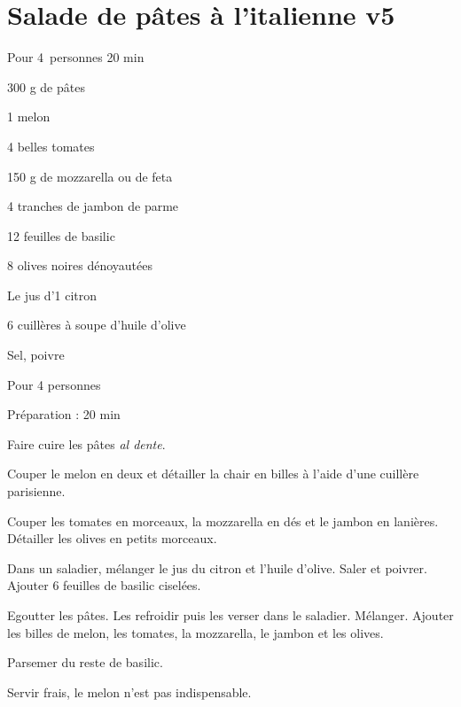 \clearpage
\section{Salade de pâtes à l'italienne v5}		%

{\flushright Pour 4 personnes
20 min}

\begin{ingredients}
\item 300 g de p\^ates
\item 1 melon
\item 4 belles tomates
\item 150 g de mozzarella ou de feta
\item 4 tranches de jambon de parme
\item 12 feuilles de basilic
\item 8 olives noires d\'enoyaut\'ees
\item Le jus d'1 citron
\item 6 cuill\`eres \`a soupe d'huile d'olive
\item Sel, poivre
\end{ingredients}
\begin{infos}
\item Pour 4 personnes
\item Préparation : 20 min
\end{infos}
\begin{etapes}
\item Faire cuire les p\^ates \textit{al dente}.
\item Couper le melon en deux et d\'etailler la chair en billes \`a l'aide d'une cuill\`ere parisienne.
\item Couper les tomates en morceaux, la mozzarella en d\'es et le jambon en lani\`eres. D\'etailler les olives en petits morceaux.
\item Dans un saladier, m\'elanger le jus du citron et l'huile d'olive. Saler et poivrer. Ajouter 6 feuilles de basilic cisel\'ees.
\item Egoutter les p\^ates. Les refroidir puis les verser dans le saladier. M\'elanger. Ajouter les billes de melon, les tomates, la mozzarella, le jambon et les olives.
\item Parsemer du reste de basilic.
\end{etapes}
\begin{conseils}
Servir frais, le melon n'est pas indispensable.
\end{conseils}

